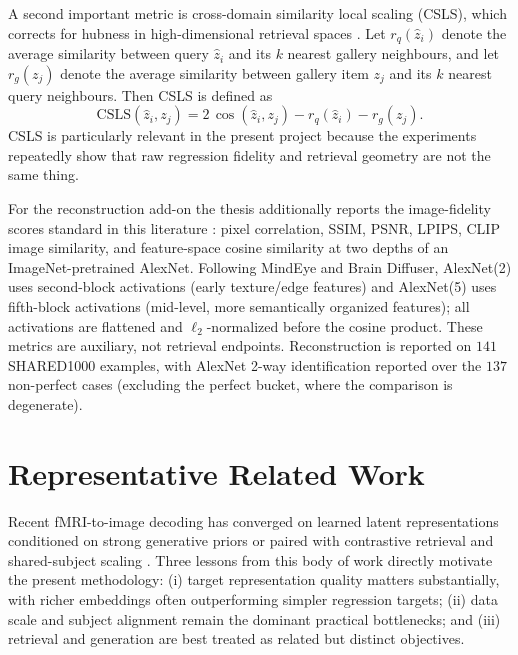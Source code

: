 A second important metric is cross-domain similarity local scaling (CSLS), which corrects for hubness in high-dimensional retrieval spaces \cite{Conneau2018}. Let $r_q(\hat{z}_i)$ denote the average similarity between query $\hat{z}_i$ and its $k$ nearest gallery neighbours, and let $r_g(z_j)$ denote the average similarity between gallery item $z_j$ and its $k$ nearest query neighbours. Then CSLS is defined as
\begin{equation}
\mathrm{CSLS}(\hat{z}_i, z_j) = 2\,\cos(\hat{z}_i, z_j) - r_q(\hat{z}_i) - r_g(z_j).
\label{eq:csls}
\end{equation}
CSLS is particularly relevant in the present project because the experiments repeatedly show that raw regression fidelity and retrieval geometry are not the same thing.

For the reconstruction add-on the thesis additionally reports the image-fidelity scores standard in this literature \cite{Scotti2023,Scotti2024,Ozcelik2023}: pixel correlation, SSIM, PSNR, LPIPS, CLIP image similarity, and feature-space cosine similarity at two depths of an ImageNet-pretrained AlexNet. Following MindEye and Brain Diffuser, AlexNet(2) uses second-block activations (early texture/edge features) and AlexNet(5) uses fifth-block activations (mid-level, more semantically organized features); all activations are flattened and $\ell_2$-normalized before the cosine product. These metrics are auxiliary, not retrieval endpoints. Reconstruction is reported on $141$ SHARED1000 examples, with AlexNet 2-way identification reported over the $137$ non-perfect cases (excluding the perfect bucket, where the comparison is degenerate).

\section{Representative Related Work}

Recent fMRI-to-image decoding has converged on learned latent representations conditioned on strong generative priors \cite{Ozcelik2023,Takagi2023} or paired with contrastive retrieval and shared-subject scaling \cite{Scotti2023,Scotti2024}. Three lessons from this body of work directly motivate the present methodology: (i) target representation quality matters substantially, with richer embeddings often outperforming simpler regression targets; (ii) data scale and subject alignment remain the dominant practical bottlenecks; and (iii) retrieval and generation are best treated as related but distinct objectives.

